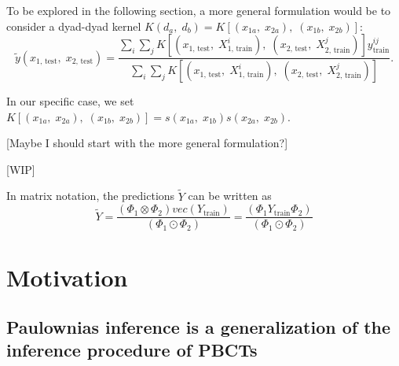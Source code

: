 \documentclass{article}
\begin{document}
To be explored in the following section, a more general formulation would be to consider a dyad-dyad kernel $K(d_a,\;d_b) = K[(x_{1a},\; x_{2a}),\; (x_{1b},\; x_{2b})]$:
%
\begin{equation}
    \label{eq:dyad-dyad}
    \tilde y (x_\text{1, test},\; x_\text{2, test}) = 
        \frac{
            \sum_i\sum_j
            K[(x_\text{1, test},\; X^i_\text{1, train}),\; (x_\text{2, test},\; X^j_\text{2, train})]
            y^{ij}_\text{train}
        }{
            \sum_i\sum_j
            K[(x_\text{1, test},\; X^i_\text{1, train}),\; (x_\text{2, test},\; X^j_\text{2, train})]
        }\text{.}
\end{equation}

In our specific case, we set $K[(x_{1a},\; x_{2a}),\; (x_{1b},\; x_{2b})] = s(x_{1a},\; x_{1b})s(x_{2a},\; x_{2b})$.

[Maybe I should start with the more general formulation?]

[WIP]

In matrix notation, the predictions $\tilde Y$ can be written as
%
\begin{equation}  %
    \tilde Y = 
        \frac{(\Phi_1 \otimes \Phi_2)
        vec(Y_\text{train})}{(\Phi_1 \odot \Phi_2)}
        =
        \frac{(\Phi_1 Y_\text{train} \Phi_2)
        }{(\Phi_1 \odot \Phi_2)}
\end{equation}


\section{Motivation}
\subsection{Paulownias inference is a generalization of the inference procedure of PBCTs}
\end{document}

